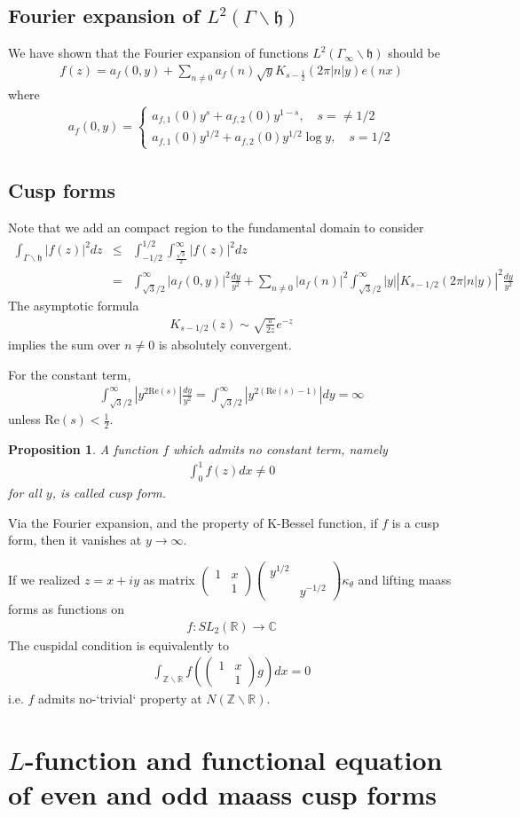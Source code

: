 \documentclass[11pt,reqno]{amsart}
\newcommand{\bna}{\begin{eqnarray*}}
\newcommand{\ena}{\end{eqnarray*}}
\newcommand{\bma}{\begin{pmatrix}}
\newcommand{\ema}{\end{pmatrix}}
\newcommand{\mk}{\mathfrak}
\def\re{{\mathrm{Re}}}
\def\C{\mathbb{C}}
\def\R{\mathbb{R}}
\def\Z{\mathbb{Z}}
\newtheorem{prop}[lemma]{Proposition}
\theoremstyle{definition}
\begin{document}
\subsection{Fourier expansion of $L^2(\Gamma\backslash\mk h)$}
We have shown that the Fourier expansion of functions $L^2(\Gamma_\infty\backslash \mk h)$
should be
\bna
f(z)=a_{f}(0,y)+\sum_{n\neq 0}a_f(n) \sqrt{y}K_{s-\frac{1}{2}}(2\pi|n|y)e(nx)
\ena
where
\bna
a_f(0,y)=
\left\{
\begin{aligned}
a_{f,1}(0)y^{s}+a_{f,2}(0)y^{1-s},\quad s=\neq 1/2\\
a_{f,1}(0)y^{1/2}+ a_{f,2}(0)y^{1/2}\log y,\quad s=1/2
\end{aligned}
\right.
\ena
\subsection{Cusp forms}
Note that  we add an compact region to the fundamental domain to consider
\bna
\int_{\Gamma\backslash \mk h}|f(z)|^2dz&\leq& \int_{-1/2}^{1/2}\int_{\frac{\sqrt{3}}{2}}^{\infty}|f(z)|^2dz\\
&=&\int_{\sqrt{3}/2}^\infty |a_f(0,y)|^2\frac{dy}{y^2}
+\sum_{n\neq 0}|a_f(n)|^2\int_{\sqrt{3}/{2}}^\infty |y|\left|K_{s-1/2}(2\pi |n|y)\right|^{2}\frac{dy}{y^2}
\ena
The asymptotic formula
\bna
K_{s-1/2}(z)\sim
\sqrt{\frac{\pi}{2z}} e^{-z}
\ena
implies the sum over $n\neq 0$ is absolutely convergent.


For the constant term,
\bna
\int_{\sqrt{3}/2}^{\infty} |y^{2\re(s)}|\frac{dy}{y^2}
=\int_{\sqrt{3}/2}^{\infty} |y^{2(\re(s)-1)}|dy
=\infty
\ena
unless $\re(s)<\frac{1}{2}$.
\begin{prop}
A function $f$ which admits no constant term, namely
\bna
\int_{0}^1f(z)dx\neq 0
\ena
for all $y$, is called cusp form.
\end{prop}
Via the Fourier expansion, and the property of K-Bessel function,
if $f$ is a cusp form, then it vanishes at $y\rightarrow\infty$.

If we realized $z=x+iy$ as matrix $\bma 1&x\\ &1\ema\bma y^{1/2}\\&y^{-1/2}\ema\kappa_\theta$
and lifting maass forms as functions on
\bna
f:SL_2(\R)\rightarrow\C
\ena
The cuspidal condition is equivalently to
\bna
\int_{\Z\backslash\R}f\left(\bma 1&x\\&1\ema g\right)dx=0
\ena
i.e. $f$ admits no-`trivial` property at $N(\Z\backslash \R)$.
\section{$L$-function and functional equation of even and odd maass cusp forms}
\end{document}
